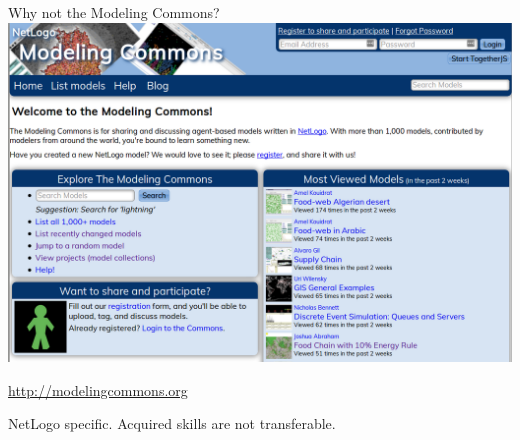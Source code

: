 \documentclass{beamer}
\begin{document}
\begin{frame}{Why not the Modeling Commons?}
  \centering
  \includegraphics[height=0.6\textheight]{commons}

  \url{http://modelingcommons.org}
  \vfill\larger\pause

  NetLogo specific. Acquired skills are not transferable.
\end{frame}
\end{document}
